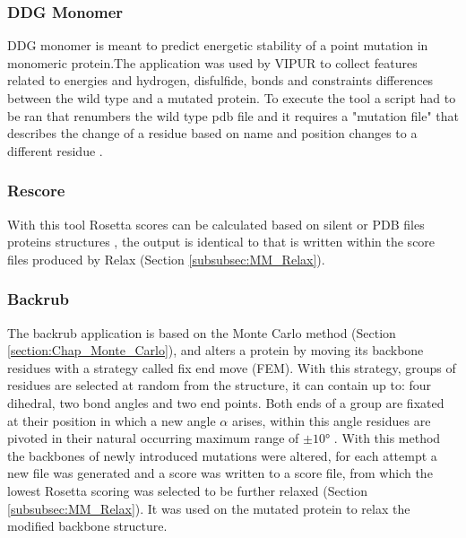 \subsubsection{DDG Monomer}
DDG monomer is meant to predict energetic stability of a point mutation in  monomeric protein.The application was used by VIPUR to collect features related to energies and hydrogen, disfulfide, bonds and constraints differences between the wild type and a mutated protein. To execute the tool a script had to be ran that renumbers the wild type pdb file and it requires a "mutation file" that describes the change of a residue based on name and position changes to a different residue \cite{leaver-fay_ddg_monomer_nodate}.
\label{subsubsec:MM_DDG_Monomer}

\subsubsection{Rescore}
With this tool Rosetta scores can be calculated based on silent or PDB files proteins structures \cite{jared_score_2016} , the output is identical to that is written within the score files produced by Relax (Section \ref{subsubsec:MM_Relax}).
\label{subsubsec:MM_Rescore}

\subsubsection{Backrub}
The backrub application is based on the Monte Carlo method (Section \ref{section:Chap_Monte_Carlo}), and alters a protein by moving its backbone residues with a strategy called fix end move (FEM). With this strategy, groups of residues are selected at random from the structure, it can contain up to: four dihedral, two bond angles and two end points. Both ends of a group are fixated at their position in which a new angle $\alpha$ arises, within this angle residues are pivoted in their natural occurring maximum range of $\pm \ang{10}$ \cite{betancourt_efficient_2005, smith_backrub_nodate}.
With this method the backbones of newly introduced mutations were altered, for each attempt a new file was generated and a score was written to a score file, from which the lowest Rosetta scoring was selected to be further relaxed (Section \ref{subsubsec:MM_Relax}).
It was used on the mutated protein to relax the modified backbone structure.
\label{subsubsec:MM_Backrub}

